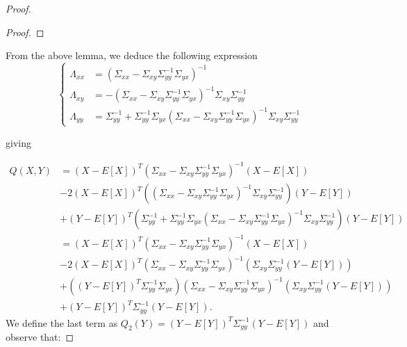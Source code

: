\documentclass{article}
\theoremstyle{definition}
\theoremstyle{remark}
\begin{document}
\begin{proof}
\begin{proof}
\end{proof}

From the above lemma, we deduce the following expression
%
\begin{equation*}
\left\{ \begin{array}{rl}
\Lambda_{xx}&=\left( \Sigma_{xx}-\Sigma_{xy}\Sigma_{yy}^{-1}\Sigma_{yx} \right)^{-1}\\
\Lambda_{xy}&=-\left( \Sigma_{xx}-\Sigma_{xy}\Sigma_{yy}^{-1}\Sigma_{yx} \right)^{-1}\Sigma_{xy}\Sigma_{yy}^{-1}\\
%
\Lambda_{yy}&=\Sigma_{yy}^{-1}+\Sigma_{yy}^{-1}\Sigma_{yx}\left( \Sigma_{xx}-\Sigma_{xy}\Sigma_{yy}^{-1}\Sigma_{yx} \right)^{-1}\Sigma_{xy}\Sigma_{yy}^{-1}
\end{array} \right. 
\end{equation*}

giving 

\begin{align*}
Q(X,Y)&=(X-E[X])^T\left( \Sigma_{xx}-\Sigma_{xy}\Sigma_{yy}^{-1}\Sigma_{yx} \right)^{-1}(X-E[X])\\
&-2(X-E[X])^T\left( \left( \Sigma_{xx}-\Sigma_{xy}\Sigma_{yy}^{-1}\Sigma_{yx} \right)^{-1}\Sigma_{xy}\Sigma_{yy}^{-1} \right)(Y-E[Y])\\
&+(Y-E[Y])^T\left( \Sigma_{yy}^{-1}+\Sigma_{yy}^{-1}\Sigma_{yx}\left( \Sigma_{xx}-\Sigma_{xy}\Sigma_{yy}^{-1}\Sigma_{yx} \right)^{-1}\Sigma_{xy}\Sigma_{yy}^{-1} \right)(Y-E[Y])\\
%
&=(X-E[X])^T\left( \Sigma_{xx}-\Sigma_{xy}\Sigma_{yy}^{-1}\Sigma_{yx} \right)^{-1}(X-E[X])\\
&-2(X-E[X])^T \left( \Sigma_{xx}-\Sigma_{xy}\Sigma_{yy}^{-1}\Sigma_{yx} \right)^{-1}\left(\Sigma_{xy}\Sigma_{yy}^{-1} (Y-E[Y])\right)\\
&+\left((Y-E[Y])^T \Sigma_{yy}^{-1}\Sigma_{yx}\right)\left( \Sigma_{xx}-\Sigma_{xy}\Sigma_{yy}^{-1}\Sigma_{yx} \right)^{-1}\left( \Sigma_{xy}\Sigma_{yy}^{-1} (Y-E[Y])\right)\\
&+(Y-E[Y])^T\Sigma_{yy}^{-1}(Y-E[Y]).
\end{align*}
We define the last term as $Q_2(Y)=(Y-E[Y])^T\Sigma_{yy}^{-1}(Y-E[Y])$ and observe that:


\end{proof}
\end{document}
